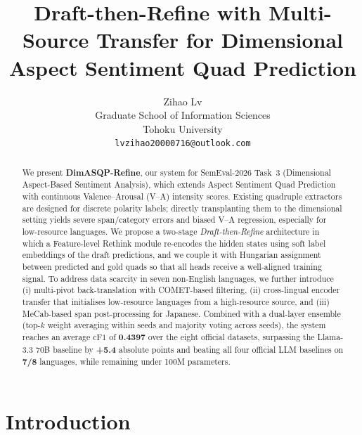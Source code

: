 \documentclass[11pt]{article}
\title{Draft-then-Refine with Multi-Source Transfer for Dimensional\\
Aspect Sentiment Quad Prediction}
\author{
Zihao Lv \\
Graduate School of Information Sciences \\
Tohoku University \\
\texttt{lvzihao20000716@outlook.com}
}
\date{}
\begin{document}
\maketitle

\begin{abstract}
We present \textbf{DimASQP-Refine}, our system for SemEval-2026 Task~3
(Dimensional Aspect-Based Sentiment Analysis), which extends Aspect
Sentiment Quad Prediction with continuous Valence--Arousal (V--A)
intensity scores. Existing quadruple extractors are designed for
discrete polarity labels; directly transplanting them to the dimensional
setting yields severe span/category errors and biased V--A regression,
especially for low-resource languages. We propose a two-stage
\emph{Draft-then-Refine} architecture in which a Feature-level Rethink
module re-encodes the hidden states using soft label embeddings of the
draft predictions, and we couple it with Hungarian assignment between
predicted and gold quads so that all heads receive a well-aligned
training signal. To address data scarcity in seven non-English
languages, we further introduce (i) multi-pivot back-translation with
COMET-based filtering, (ii) cross-lingual encoder transfer that
initialises low-resource languages from a high-resource source, and
(iii) MeCab-based span post-processing for Japanese. Combined with a
dual-layer ensemble (top-$k$ weight averaging within seeds and majority
voting across seeds), the system reaches an average $\mathrm{cF1}$ of
\textbf{0.4397} over the eight official datasets, surpassing the
Llama-3.3 70B baseline by \textbf{+5.4} absolute points and beating all
four official LLM baselines on \textbf{7/8} languages, while remaining
under 100M parameters.
\end{abstract}

\section{Introduction}
\label{sec:intro}
\end{document}
